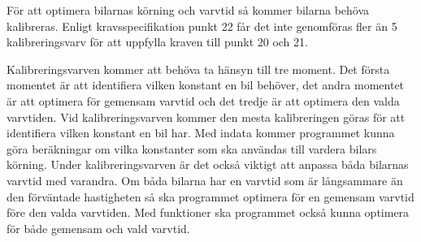 För att optimera bilarnas körning och varvtid så kommer bilarna behöva
kalibreras. Enligt kravsspecifikation punkt 22 får det inte genomföras fler än
5 kalibreringsvarv för att uppfylla kraven till punkt 20 och 21.

Kalibreringsvarven kommer att behöva ta hänsyn till tre moment. Det första momentet är att
identifiera vilken konstant en bil behöver, det andra momentet är att optimera för
gemensam varvtid och det tredje är att optimera den valda varvtiden. Vid
kalibreringsvarven kommer den mesta kalibreringen göras för att identifiera
vilken konstant en bil har. Med indata kommer programmet kunna göra beräkningar
om vilka konstanter som ska användas till vardera bilars körning. Under
kalibreringsvarven är det också viktigt att anpassa båda bilarnas varvtid med
varandra. Om båda bilarna har en varvtid som är långsammare än den förväntade
hastigheten så ska programmet optimera för en gemensam varvtid före den valda
varvtiden. Med funktioner ska programmet också kunna optimera för både
gemensam och vald varvtid.


